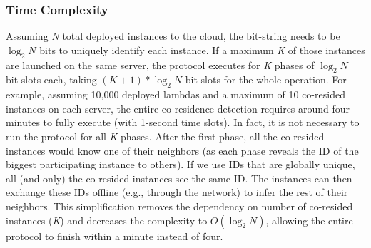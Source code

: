 \subsubsection{Time Complexity}
\label{sec:protocol:complexity}
Assuming \textit{N} total deployed instances to the cloud, the bit-string needs
to be $\log_2N$ bits to uniquely identify each instance. If a maximum \textit{K}
of those instances are launched on the same server, the protocol executes for
\textit{K} phases of $\log_2N$ bit-slots each, taking $(K+1)*\log_2N$ bit-slots
for the whole operation. For example, assuming 10,000 deployed lambdas and a
maximum of 10 co-resided instances on each server, the entire  co-residence
detection requires around four minutes to fully execute (with 1-second time
slots). In fact, it is not necessary to run the protocol for all \textit{K}
phases. After the first phase, all the co-resided instances would know one of
their neighbors (as each phase reveals the ID of the biggest participating
instance to others).  If we use IDs that are globally unique, all (and only) the
co-resided instances see the same ID. The instances can then exchange these IDs
offline (e.g., through the network) to infer the rest of their neighbors. This
simplification removes the dependency on number of co-resided instances
(\textit{K}) and decreases the complexity to $O(\log_2N)$, allowing the entire
protocol to finish within a minute instead of four.


